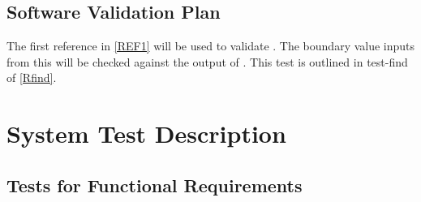 \documentclass[12pt, titlepage]{article}
\begin{document}
\subsection{Software Validation Plan}
\label{SoftwareValidationPlan}
The first reference in \ref{REF1} will be used to validate \progname. The 
boundary value inputs from this will be checked against the output of 
\progname. This test is outlined in test-find of \ref{Rfind}. 

\newpage
\section{System Test Description}
	
\subsection{Tests for Functional Requirements}
\label{FRtests}
\end{document}
